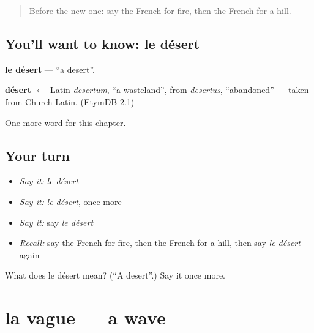\label{lesson:FR-C84-desert}



\begin{quote}
Before the new one: say the French for fire, then the French for a hill.
\end{quote}

\subsection*{You'll want to know: le désert}
\textbf{le désert} — \textquotedblleft{}a desert\textquotedblright{}.

\begin{cousinweb}
\textbf{désert} $\leftarrow$ Latin \emph{desertum}, \textquotedblleft{}a wasteland\textquotedblright{}, from \emph{desertus}, \textquotedblleft{}abandoned\textquotedblright{} — taken from Church Latin. (EtymDB 2.1)
\end{cousinweb}

\begin{grammarlens}[title={What you've built}]
One more word for this chapter.
\end{grammarlens}

\subsection*{Your turn}
\begin{itemize}
\raggedright
  \item \emph{Say it:} \emph{le désert}
  \item \emph{Say it:} \emph{le désert}, once more
  \item \emph{Say it:} say \emph{le désert}
  \item \emph{Recall:} say the French for fire, then the French for a hill, then say \emph{le désert} again
\end{itemize}

\begin{tcolorbox}[breakable,colback=teal!4,colframe=teal!35!black,title={Before you move on}]
What does le désert mean? (\textquotedblleft{}A desert\textquotedblright{}.) Say it once more.
\end{tcolorbox}
\section[la vague]{la vague — a wave}

\label{lesson:FR-C84-vague}



